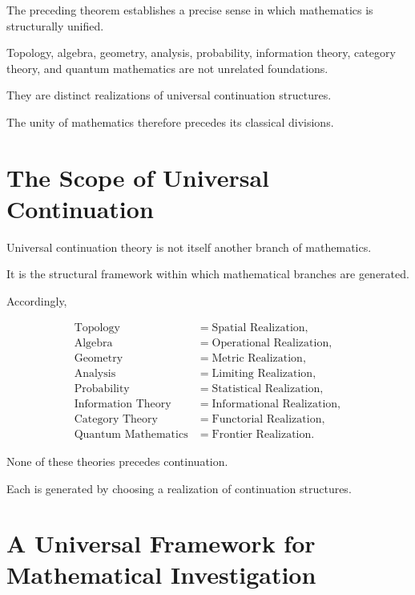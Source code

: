 \documentclass[13pt,openany]{book}
\theoremstyle{plain}
\theoremstyle{definition}
\begin{document}
The preceding theorem establishes a precise sense in which mathematics is
structurally unified.

Topology, algebra, geometry, analysis, probability, information theory,
category theory, and quantum mathematics are not unrelated foundations.

They are distinct realizations of universal continuation structures.

The unity of mathematics therefore precedes its classical divisions.

\section{The Scope of Universal Continuation}

Universal continuation theory is not itself another branch of mathematics.

It is the structural framework within which mathematical branches are generated.

Accordingly,

\[
\begin{aligned}
\text{Topology}
&=\text{Spatial Realization},\\
\text{Algebra}
&=\text{Operational Realization},\\
\text{Geometry}
&=\text{Metric Realization},\\
\text{Analysis}
&=\text{Limiting Realization},\\
\text{Probability}
&=\text{Statistical Realization},\\
\text{Information Theory}
&=\text{Informational Realization},\\
\text{Category Theory}
&=\text{Functorial Realization},\\
\text{Quantum Mathematics}
&=\text{Frontier Realization}.
\end{aligned}
\]

None of these theories precedes continuation.

Each is generated by choosing a realization of continuation structures.

\section{A Universal Framework for Mathematical Investigation}
\end{document}

